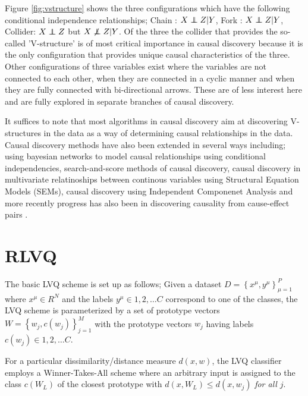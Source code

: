 \documentclass{esannV2}
\newcommand\independent{\protect\mathpalette{\protect\independenT}{\perp}}
\def\independenT#1#2{\mathrel{\rlap{$#1#2$}\mkern2mu{#1#2}}}
\def\ci{\independent}
\def\dep{\not\independent}
\begin{document}
Figure \ref{fig:vstructure} shows the three configurations which have the following conditional independence relationships; Chain : $X \ci Z | Y$, Fork : $X \ci Z | Y$, Collider: $X \ci Z$ but $X \dep Z | Y$. Of the three the collider that provides the so-called 'V-structure' is of most critical importance in causal discovery because it is the only configuration that provides unique causal characteristics of the three. Other configurations of three variables exist where the variables are not connected to each other, when they are connected in a cyclic manner and when they are fully connected with bi-directional arrows. These are of less interest here and are fully explored in separate branches of causal discovery.

It suffices to note that most algorithms in causal discovery aim at discovering V-structures in the data as a way of determining causal relationships in the data. Causal discovery methods have also been extended in several ways including; using bayesian networks to model causal relationships using conditional independencies, search-and-score methods of causal discovery, causal discovery in multivariate relatinoships between continous variables using Structural Equation Models (SEMs), causal discovery using Independent Componenet Analysis and more recently progress has also been in discovering causality from cause-effect pairs \cite{15,14}.

\section{RLVQ}
\label{sec:RLVQ}

The basic LVQ scheme is set up as follows; Given a dataset $D = \left\{x^\mu, y^\mu\right\}^P_{\mu = 1}$ where $x^\mu \in R^N$ and the labels $y^\mu \in {1,2,\ldots C}$ correspond to one of the classes, the LVQ scheme is parameterized by a set of prototype vectors $W = \left\{w_j, c(w_j)\right\}^M_{j=1}$ with the prototype vectors $w_j$ having labels $c(w_j) \in {1,2,\dots C}$.

For a particular dissimilarity/distance measure $d(x,w)$, the LVQ classifier employs a Winner-Takes-All scheme where an arbitrary input is assigned to the class $c(W_L)$ of the closest prototype with $d(x,W_L) \leq d(x,w_j)$ \textsl{for all} $j$.
\end{document}
